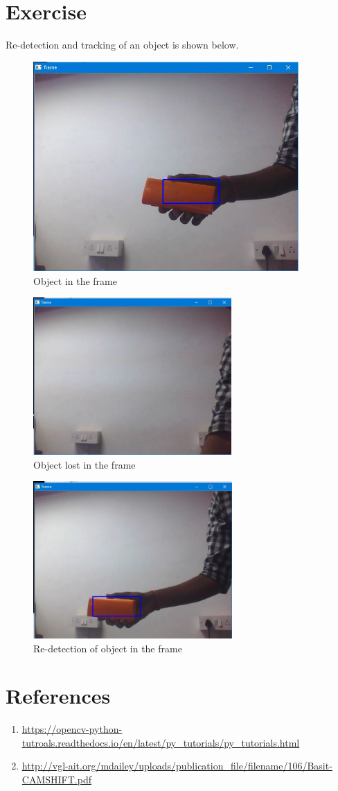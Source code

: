 \documentclass[11pt,a4paper]{article}
\begin{document}
	\section{Exercise}
	Re-detection and tracking of an object  is shown below.
	\begin{figure}[h]
 \includegraphics[width=0.9\linewidth, height=8cm]{Image1.jpg}
   \centering
 \caption{Object in the frame}
  \end{figure}
  \begin{figure}[h]
 \includegraphics[width=0.9\linewidth, height=6cm]{Image2.jpg}
   \centering
 \caption{Object lost in the frame}
  \end{figure}
  \begin{figure}[h]
 \includegraphics[width=0.9\linewidth, height=6cm]{Image3.jpg}
   \centering
 \caption{Re-detection of object in the frame}
  \end{figure}
	\section{References}
	\begin{enumerate}
			\item \url{https://opencv-python-tutroals.readthedocs.io/en/latest/py_tutorials/py_tutorials.html}

\item \url{http://vgl-ait.org/mdailey/uploads/publication_file/filename/106/Basit-CAMSHIFT.pdf}
   \end{enumerate}
	
\end{document}
